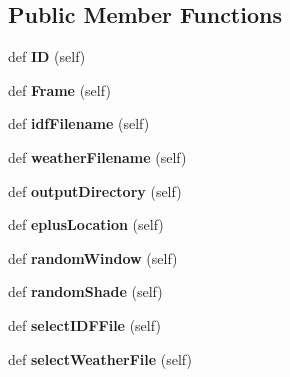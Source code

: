 \subsection*{Public Member Functions}
\begin{DoxyCompactItemize}
\item 
\mbox{\label{class_f_run_1_1_frm_run_adb8818239148d2e5c5833a2b062ee9ad}} 
def {\bfseries ID} (self)
\item 
\mbox{\label{class_f_run_1_1_frm_run_acf44064249ee17c3e8952b4c33512f86}} 
def {\bfseries Frame} (self)
\item 
\mbox{\label{class_f_run_1_1_frm_run_a83733e07070207e5d3126c38c9d13b64}} 
def {\bfseries idf\+Filename} (self)
\item 
\mbox{\label{class_f_run_1_1_frm_run_a498062a3c3c3e7e027f207deb8b66044}} 
def {\bfseries weather\+Filename} (self)
\item 
\mbox{\label{class_f_run_1_1_frm_run_a2e299137c9278a3e19be8637159b45f2}} 
def {\bfseries output\+Directory} (self)
\item 
\mbox{\label{class_f_run_1_1_frm_run_ab3cce165992f522f669dcec287ea44dd}} 
def {\bfseries eplus\+Location} (self)
\item 
\mbox{\label{class_f_run_1_1_frm_run_aef9017d108c23a46cf1104cb60008b22}} 
def {\bfseries random\+Window} (self)
\item 
\mbox{\label{class_f_run_1_1_frm_run_adf33bbbb399128db1d551e78f27035ff}} 
def {\bfseries random\+Shade} (self)
\item 
\mbox{\label{class_f_run_1_1_frm_run_af2a9ec290f7ae7492fe63585812b8183}} 
def {\bfseries select\+I\+D\+F\+File} (self)
\item 
\mbox{\label{class_f_run_1_1_frm_run_a4f5fd238b8fc922831182512cc48cc2a}} 
def {\bfseries select\+Weather\+File} (self)
\item 

\end{DoxyCompactItemize}
